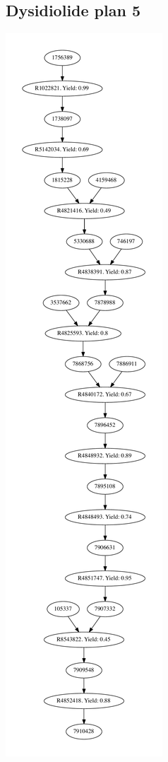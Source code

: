 \documentclass[a4paper,10pt,titlepage]{paper}
\begin{document}
\subsection{Dysidiolide plan 5}
\centering
\includegraphics[scale=0.35]{Synteseplaner/Dysidiolide/plan5.pdf}
\label{Appendix::Dysidiolide5}
\end{document}
